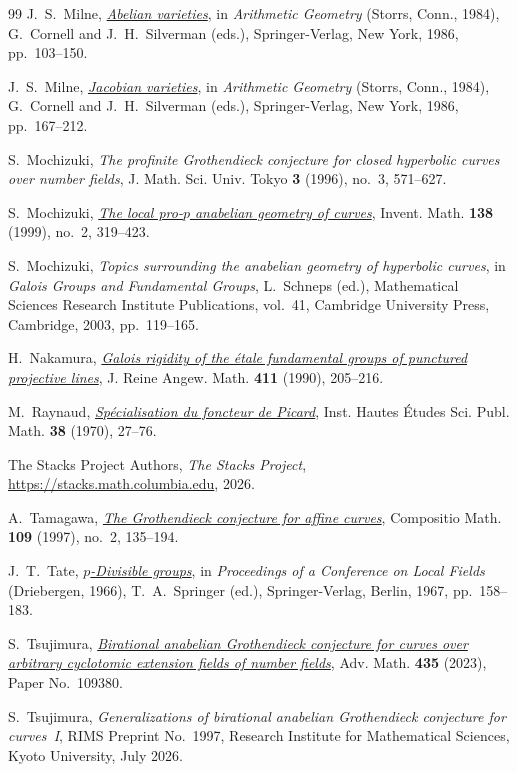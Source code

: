 \documentclass[11pt,a4paper]{article}
\numberwithin{equation}{section}
\theoremstyle{plain}
\theoremstyle{definition}
\theoremstyle{remark}
\begin{document}
\begin{thebibliography}{99}
J.~S.~Milne,
\href{https://doi.org/10.1007/978-1-4613-8655-1_5}{\emph{Abelian varieties}},
in \emph{Arithmetic Geometry} (Storrs, Conn., 1984),
G.~Cornell and J.~H.~Silverman (eds.),
Springer-Verlag, New York, 1986, pp.~103--150.

J.~S.~Milne,
\href{https://doi.org/10.1007/978-1-4613-8655-1_7}{\emph{Jacobian varieties}},
in \emph{Arithmetic Geometry} (Storrs, Conn., 1984),
G.~Cornell and J.~H.~Silverman (eds.),
Springer-Verlag, New York, 1986, pp.~167--212.

S.~Mochizuki, \emph{The profinite Grothendieck conjecture for closed
hyperbolic curves over number fields},
J. Math. Sci. Univ. Tokyo \textbf{3} (1996), no.~3, 571--627.

S.~Mochizuki,
\href{https://doi.org/10.1007/s002220050381}{\emph{The local pro-$p$
anabelian geometry of curves}},
Invent. Math. \textbf{138} (1999), no.~2, 319--423.

S.~Mochizuki,
\emph{Topics surrounding the anabelian geometry of hyperbolic curves},
in \emph{Galois Groups and Fundamental Groups},
L.~Schneps (ed.), Mathematical Sciences Research Institute Publications,
vol.~41, Cambridge University Press, Cambridge, 2003, pp.~119--165.

H.~Nakamura,
\href{https://doi.org/10.1515/crll.1990.411.205}{\emph{Galois rigidity
of the \'etale fundamental groups of punctured projective lines}},
J. Reine Angew. Math. \textbf{411} (1990), 205--216.

M.~Raynaud,
\href{https://doi.org/10.1007/BF02684651}{\emph{Sp\'ecialisation du
foncteur de Picard}},
Inst. Hautes \'Etudes Sci. Publ. Math. \textbf{38} (1970), 27--76.

The Stacks Project Authors, \emph{The Stacks Project},
\url{https://stacks.math.columbia.edu}, 2026.

A.~Tamagawa,
\href{https://doi.org/10.1023/A:1000114400142}{\emph{The Grothendieck
conjecture for affine curves}},
Compositio Math. \textbf{109} (1997), no.~2, 135--194.

J.~T.~Tate,
\href{https://doi.org/10.1007/978-3-642-87942-5_12}{\emph{$p$-Divisible groups}},
in \emph{Proceedings of a Conference on Local Fields}
(Driebergen, 1966), T.~A.~Springer (ed.),
Springer-Verlag, Berlin, 1967, pp.~158--183.

S.~Tsujimura,
\href{https://doi.org/10.1016/j.aim.2023.109380}{\emph{Birational anabelian
Grothendieck conjecture for curves over arbitrary cyclotomic extension
fields of number fields}},
Adv. Math. \textbf{435} (2023), Paper No.~109380.

S.~Tsujimura, \emph{Generalizations of birational anabelian Grothendieck
conjecture for curves~I},
RIMS Preprint No.~1997, Research Institute for Mathematical Sciences,
Kyoto University, July 2026.

\end{thebibliography}
\end{document}
